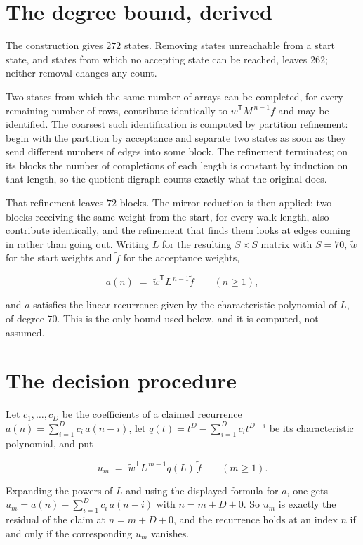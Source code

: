 \documentclass[11pt]{article}
\theoremstyle{definition}
\begin{document}
\section{The degree bound, derived}

The construction gives $272$ states. Removing states unreachable from a start state, and states from which no accepting state can be reached, leaves $262$; neither removal changes any count.

Two states from which the same number of arrays can be completed, for every remaining number of rows, contribute identically to $w^{\mathsf T}M^{\,n-1}f$ and may be identified. The coarsest such identification is computed by partition refinement: begin with the partition by acceptance and separate two states as soon as they send different numbers of edges into some block. The refinement terminates; on its blocks the number of completions of each length is constant by induction on that length, so the quotient digraph counts exactly what the original does.

That refinement leaves $72$ blocks. The mirror reduction is then applied: two blocks receiving the same weight from the start, for every walk length, also contribute identically, and the refinement that finds them looks at edges coming in rather than going out. Writing $L$ for the resulting $S \times S$ matrix with $S = 70$, $\tilde w$ for the start weights and $\tilde f$ for the acceptance weights,

\[a(n) \;=\; \tilde w^{\mathsf T} L^{\,n-1} \tilde f \qquad (n \ge 1),\]

and $a$ satisfies the linear recurrence given by the characteristic polynomial of $L$, of degree $70$. This is the only bound used below, and it is computed, not assumed.

\section{The decision procedure}

Let $c_1,\dots,c_D$ be the coefficients of a claimed recurrence $a(n) = \sum_{i=1}^{D} c_i\,a(n-i)$, let $q(t) = t^{D} - \sum_{i=1}^{D} c_i t^{D-i}$ be its characteristic polynomial, and put

\[u_m \;=\; \tilde w^{\mathsf T} L^{\,m-1} q(L)\,\tilde f \qquad (m \ge 1).\]

Expanding the powers of $L$ and using the displayed formula for $a$, one gets $u_m = a(n) - \sum_{i=1}^{D} c_i\,a(n-i)$ with $n = m + D + 0$. So $u_m$ is exactly the residual of the claim at $n = m + D + 0$, and the recurrence holds at an index $n$ if and only if the corresponding $u_m$ vanishes.
\end{document}
